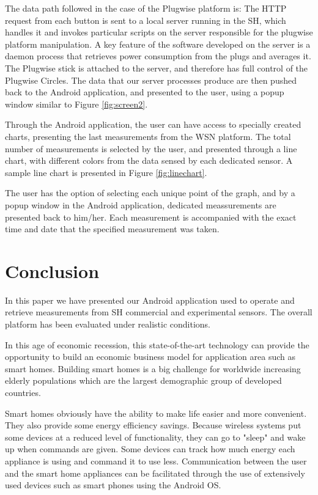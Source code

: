 \documentclass[conference]{IEEEtran}
\begin{document}
The data path followed in the case of the Plugwise platform is:
The HTTP request from each button is sent to a local server running in the SH, which handles it and invokes particular scripts on the server responsible for the plugwise platform manipulation.
A key feature of the software developed on the server is a daemon process that retrieves power consumption from the plugs and averages it.
The Plugwise stick is attached to the server, and therefore has full control of the Plugwise Circles.
The data that our server processes produce are then pushed back to the Android application, and presented to the user, using a popup window similar to Figure \ref{fig:screen2}.

Through the Android application, the user can have access to specially created charts, presenting the last measurements from the WSN platform.
The total number of measurements is selected by the user, and presented through a line chart, with different colors from the data sensed by each dedicated sensor.
A sample line chart is presented in Figure \ref{fig:linechart}.

The user has the option of selecting each unique point of the graph, and by a popup window in the Android application, dedicated meassurements are presented back to him/her. 
Each measurement is accompanied with the exact time and date that the specified measurement was taken.



\section{Conclusion}
In this paper we have presented our Android application used to operate and retrieve measurements from SH commercial and experimental sensors.
The overall platform has been evaluated under realistic conditions.


In this age of economic recession, this state-of-the-art technology can provide the opportunity to build an economic business model for application area such as smart homes. 
Building smart homes is a big challenge for worldwide increasing elderly populations which are the largest demographic group of developed countries.


Smart homes obviously have the ability to make life easier and more convenient. They also provide some energy efficiency savings. 
Because wireless systems put some devices at a reduced level of functionality, they can go to "sleep" and wake up when commands are given. 
Some devices can track how much energy each appliance is using and command it to use less. 
Communication between the user and the smart home appliances can be facilitated through the use of extensively used devices such as smart phones using the Android OS. 
\end{document}
